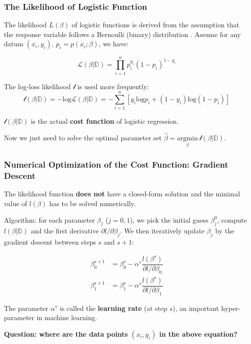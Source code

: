 \documentclass[10pt,aspectratio=169]{beamer}
\begin{document}
  \begin{frame}
    \frametitle{The Likelihood of Logistic Function}

    The likelihood $L(\beta)$ of logistic functions is derived from
    the assumption that the response variable follows a Bernoulli
    (binary) distribution\let\thefootnote\relax%
    . %
    Assume for any datum
    $(x_{i}, y_{i})$, $p_{i} = p(x_{i}; \beta)$, we have:

        \begin{equation*}
          \mathscr{L}(\beta|\mathbb{D}) = \prod_{i=1}^{n} p_{i}^{y_{i}} (1 - p_{i})^{1-y_{i}}
        \end{equation*}

        The log-loss likelihood $\mathscr{l}$ is used more frequently:
        \begin{equation*}
          \mathscr{l}(\beta|\mathbb{D}) = -\mathrm{log} \mathscr{L}(\beta|\mathbb{D}) = - \sum_{i=1}^{n} \left[ y_{i} \mathrm{log}p_{i} +  (1 - y_{i}) \mathrm{log}(1 - p_{i}) \right]
        \end{equation*}
        
        
        $\mathscr{l}(\beta|\mathbb{D})$ is the actual \textbf{cost
          function} of logistic regression.  \vfill
        
        Now we just need to solve the optimal parameter set
        $\hat{\beta} = \underset{\beta}{\mathrm{argmin}}\
        \mathscr{l}(\beta|\mathbb{D})$.
        
      \end{frame}


      \begin{frame}
        \frametitle{Numerical Optimization of the Cost Function:
          Gradient Descent}
        The likelihood function \textbf{does not} have a closed-form
        solution and the minimal value of $l(\beta)$ has to be solved
        numerically.

        \vfill Algorithm: for each parameter $\beta_{j}$ ($j=0, 1$),
        we pick the initial guess $\beta_{j}^{0}$, compute
        $l(\beta|\mathbb{D})$ and the first derivative
        $\partial l/\partial \beta_{j}$. We then iteratively update
        $\beta_{j}$ by the gradient descent between steps $s$ and
        $s+1$:

        \begin{align*}
          \beta_{0}^{s+1} &= \beta_{0}^{s} - \alpha^{s} \dfrac{l(\beta^{s})}{\partial l/\partial \beta_{0}} \\
          \beta_{1}^{s+1} &= \beta_{1}^{s} - \alpha^{s} \dfrac{l(\beta^{s})}{\partial l/\partial \beta_{1}}
        \end{align*}

        The parameter $\alpha^{s}$ is called the \textbf{learning
          rate} (at step $s$), an important hyper-parameter in machine
        learning.

        \vfill \textbf{Question: where are the data points
          $(x_{i}, y_{i})$ in the above equation?}

      \end{frame}
\end{document}
